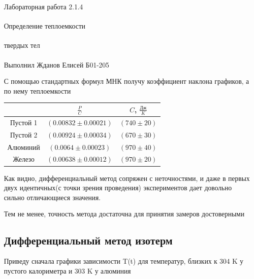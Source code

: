 \documentclass{astroedu-lab}
\begin{document}
\begin{problem}{\huge Лабораторная работа 2.1.4\\\\Определение теплоемкости\\\\твердых тел\\\\Выполнил Жданов Елисей Б01-205}
\newpage

С помощью стандартных формул МНК получу коэффициент наклона графиков, а по нему теплоемкости

\begin{center}
\begin{tabular}{|c|c|c|}
\hline
 & $\frac{P}{C}$ & $C$, $\frac{\text{Дж}}{K}$ \\ \hline
Пустой 1 & $(0.00832 \pm 0.00021)$ & $(740 \pm 20)$ \\
Пустой 2 & $(0.00924 \pm 0.00034)$ & $(670 \pm 30)$ \\
Алюминий & $(0.0064  \pm 0.00023)$ & $(970 \pm 40)$ \\
Железо &   $(0.00638 \pm 0.00012)$&  $(970 \pm 20)$ \\
\hline
\end{tabular}
\end{center}

Как видно, дифференциальный метод сопряжен с неточностями, и даже в первых двух идентичных(с точки зрения проведения) экспериментов дает довольно сильно отличающиеся значения.

Тем не менее, точность метода достаточна для принятия замеров достоверными

\subsection{Дифференциальный метод изотерм}

Приведу сначала графики зависимости T(t) для температур, близких к 304 K у пустого калориметра и 303 K у алюминия


\end{problem}
\end{document}
